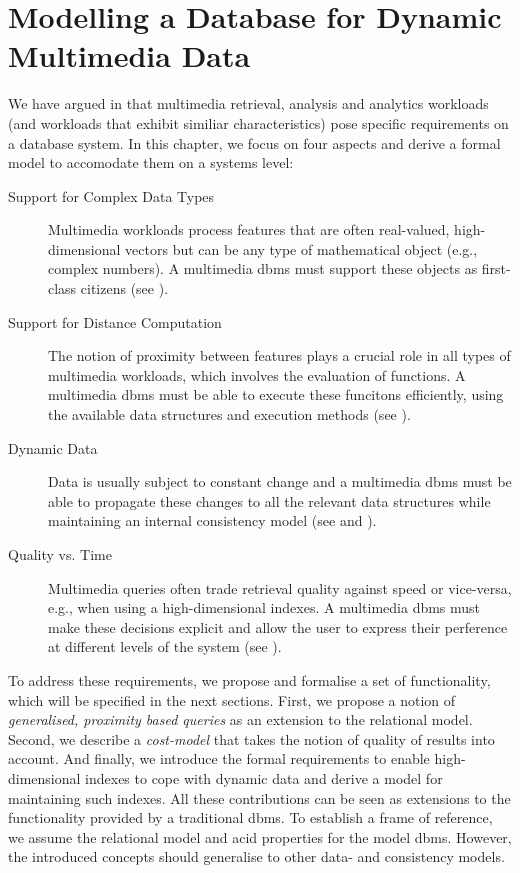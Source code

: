 \chapter{Modelling a Database for Dynamic Multimedia Data}
\label{chapter:system_model}

We have argued in  that multimedia retrieval, analysis and analytics workloads (and workloads that exhibit similiar characteristics) pose specific requirements on a database system. In this chapter, we focus on four aspects and derive a formal model to accomodate them on a systems level:

\begin{description}
    \item[Support for Complex Data Types] Multimedia workloads process features that are often real-valued, high-dimensional vectors but can be any type of mathematical object (e.g., complex numbers). A multimedia \acrshort{dbms} must support these objects as first-class citizens (see ).
    \item[Support for Distance Computation] The notion of proximity between features plays a crucial role in all types of multimedia workloads, which involves the evaluation of functions. A multimedia \acrshort{dbms} must be able to execute these funcitons efficiently, using the available data structures and execution methods (see ).
    \item[Dynamic Data] Data is usually subject to constant change and a multimedia \acrshort{dbms} must be able to propagate these changes to all the relevant data structures while maintaining an internal consistency model (see  and ).
    \item[Quality vs. Time] Multimedia queries often trade retrieval quality against speed or vice-versa, e.g., when using a high-dimensional indexes. A multimedia \acrshort{dbms} must make these decisions explicit and allow the user to express their perference at different levels of the system (see ).
\end{description}

To address these requirements, we propose and formalise a set of functionality, which will be specified in the next sections. First, we propose a notion of \emph{generalised, proximity based queries} as an extension to the relational model. Second, we describe a \emph{cost-model} that takes the notion of quality of results into account. And finally, we introduce the formal requirements to enable high-dimensional indexes to cope with dynamic data and derive a model for maintaining such indexes. All these contributions can be seen as extensions to the functionality provided by a traditional \acrshort{dbms}. To establish a frame of reference, we assume the relational model and \acrshort{acid} properties for the model \acrshort{dbms}. However, the introduced concepts should generalise to other data- and consistency models.

